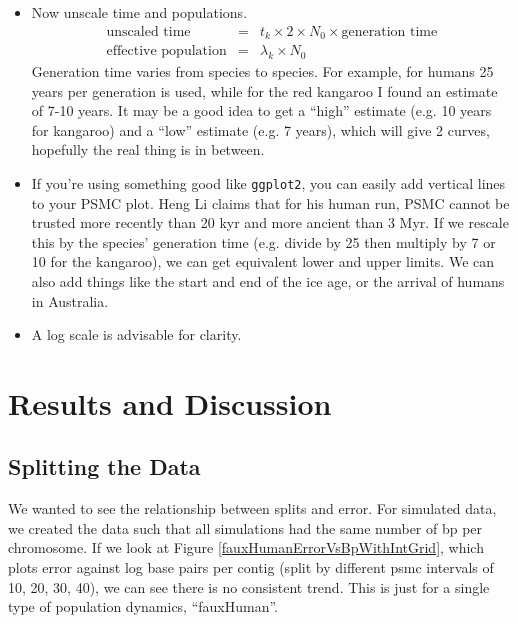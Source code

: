 \documentclass[11pt,a4paper]{article}
\begin{document}
\begin{itemize}
\item Now unscale time and populations.
\begin{eqnarray*}
\text{unscaled time}&=&t_k\times 2\times N_0\times \text{generation time}\\
\text{effective population} &=& \lambda_k\times N_0
\end{eqnarray*}
Generation time varies from species to species. For example, for humans 25 years per generation is used, while for the red kangaroo I found an estimate of 7-10 years. It may be a good idea to get a ``high'' estimate (e.g. 10 years for kangaroo) and a ``low'' estimate (e.g. 7 years), which will give 2 curves, hopefully the real thing is in between.
\item If you're using something good like \verb|ggplot2|, you can easily add vertical lines to your PSMC plot. Heng Li claims that for his human run, PSMC cannot be trusted more recently than 20 kyr and more ancient than 3 Myr. If we rescale this by the species' generation time (e.g. divide by 25 then multiply by 7 or 10 for the kangaroo), we can get equivalent lower and upper limits. We can also add things like the start and end of the ice age, or the arrival of humans in Australia.
\item A log scale is advisable for clarity.
\end{itemize}


\section{Results and Discussion}

\subsection{Splitting the Data}
We wanted to see the relationship between splits and error. For simulated data, we created the data such that all simulations had the same number of bp per chromosome. If we look at Figure \ref{fauxHumanErrorVsBpWithIntGrid}, which plots error against log base pairs per contig (split by different psmc intervals of 10, 20, 30, 40), we can see there is no consistent trend. This is just for a single type of population dynamics, ``fauxHuman''.
\end{document}
